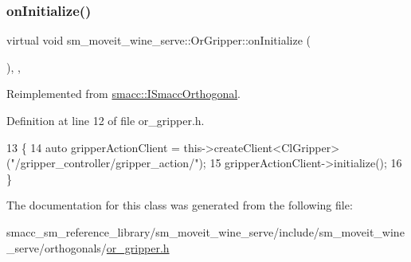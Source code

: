 \subsubsection{\texorpdfstring{on\+Initialize()}{onInitialize()}}
{\footnotesize\ttfamily virtual void sm\+\_\+moveit\+\_\+wine\+\_\+serve\+::\+Or\+Gripper\+::on\+Initialize (\begin{DoxyParamCaption}{ }\end{DoxyParamCaption})\hspace{0.3cm}{\ttfamily [inline]}, {\ttfamily [override]}, {\ttfamily [virtual]}}



Reimplemented from \hyperlink{classsmacc_1_1ISmaccOrthogonal_a6bb31c620cb64dd7b8417f8705c79c7a}{smacc\+::\+I\+Smacc\+Orthogonal}.



Definition at line 12 of file or\+\_\+gripper.\+h.


\begin{DoxyCode}
13     \{
14         \textcolor{keyword}{auto} gripperActionClient = this->createClient<ClGripper>(\textcolor{stringliteral}{"/gripper\_controller/gripper\_action/"});
15         gripperActionClient->initialize();
16     \}
\end{DoxyCode}


The documentation for this class was generated from the following file\+:\begin{DoxyCompactItemize}
\item 
smacc\+\_\+sm\+\_\+reference\+\_\+library/sm\+\_\+moveit\+\_\+wine\+\_\+serve/include/sm\+\_\+moveit\+\_\+wine\+\_\+serve/orthogonals/\hyperlink{sm__moveit__wine__serve_2include_2sm__moveit__wine__serve_2orthogonals_2or__gripper_8h}{or\+\_\+gripper.\+h}\end{DoxyCompactItemize}

